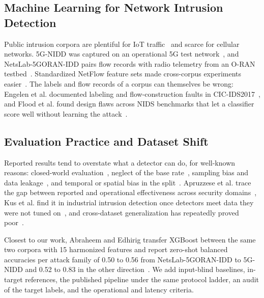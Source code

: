 \documentclass{ieeeaccess}
\begin{document}
\subsection{Machine Learning for Network Intrusion Detection}

Public intrusion corpora are plentiful for IoT traffic~\cite{koroniotis2019botiot,moustafa2021toniot,ferrag2022edgeiiot,neto2023ciciot,sharafaldin2018cicids} and scarce for cellular networks. 5G-NIDD was captured on an operational 5G test network~\cite{samarakoon2022nidd,siriwardhana2025descriptor}, and NetsLab-5GORAN-IDD pairs flow records with radio telemetry from an O-RAN testbed~\cite{abedzadeh2025netslab}. Standardized NetFlow feature sets made cross-corpus experiments easier~\cite{sarhan2021netflow,sarhan2022standard}. The labels and flow records of a corpus can themselves be wrong: Engelen et al. documented labeling and flow-construction faults in CIC-IDS2017~\cite{engelen2021troubleshooting}, and Flood et al. found design flaws across NIDS benchmarks that let a classifier score well without learning the attack~\cite{flood2024smells}.

\subsection{Evaluation Practice and Dataset Shift}

Reported results tend to overstate what a detector can do, for well-known reasons: closed-world evaluation~\cite{sommer2010outside}, neglect of the base rate~\cite{axelsson2000baserate}, sampling bias and data leakage~\cite{arp2022dosdonts,kapoor2023leakage}, and temporal or spatial bias in the split~\cite{pendlebury2019tesseract}. Apruzzese et al. trace the gap between reported and operational effectiveness across security domains~\cite{apruzzese2023role}, Kus et al. find it in industrial intrusion detection once detectors meet data they were not tuned on~\cite{kus2022falsesense}, and cross-dataset generalization has repeatedly proved poor~\cite{dhooge2020interdataset,layeghy2022generalisability,layeghy2023benchmarking}.

Closest to our work, Abraheem and Edhirig transfer XGBoost between the same two corpora with 15 harmonized features and report zero-shot balanced accuracies per attack family of 0.50 to 0.56 from NetsLab-5GORAN-IDD to 5G-NIDD and 0.52 to 0.83 in the other direction~\cite{abraheem2026bidirectional}. We add input-blind baselines, in-target references, the published pipeline under the same protocol ladder, an audit of the target labels, and the operational and latency criteria.
\end{document}
